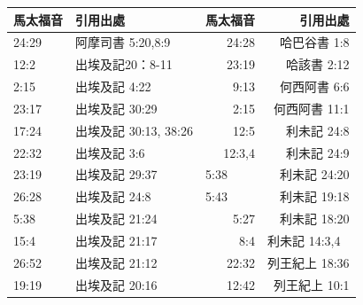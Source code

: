 \begin{table}[htbp]
  \centering

    \begin{tabular}{|p{6.93em}|p{13.93em}|r|r|}
    \toprule
    \rowcolor[rgb]{ .749,  .749,  .749} \textcolor[rgb]{ .267,  .447,  .769}{\textbf{馬太福音}} & \textcolor[rgb]{ .267,  .447,  .769}{\textbf{引用出處}} & \multicolumn{1}{p{6.715em}|}{\textcolor[rgb]{ .267,  .447,  .769}{\textbf{馬太福音}}} & \multicolumn{1}{p{12.645em}|}{\textcolor[rgb]{ .267,  .447,  .769}{\textbf{引用出處}}} \\
    \midrule
    24:29 & 阿摩司書 5:20,8:9 & \multicolumn{1}{p{6.715em}|}{24:28} & \multicolumn{1}{p{12.645em}|}{哈巴谷書 1:8} \\
    \midrule
    12:2  & 出埃及記20：8-11 & \multicolumn{1}{p{6.715em}|}{23:19} & \multicolumn{1}{p{12.645em}|}{哈該書 2:12} \\
    \midrule
    2:15  & 出埃及記 4:22 & \multicolumn{1}{p{6.715em}|}{9:13} & \multicolumn{1}{p{12.645em}|}{何西阿書 6:6} \\
    \midrule
    23:17 & 出埃及記 30:29 & \multicolumn{1}{p{6.715em}|}{2:15} & \multicolumn{1}{p{12.645em}|}{何西阿書 11:1} \\
    \midrule
    17:24 & 出埃及記 30:13, 38:26 & \multicolumn{1}{p{6.715em}|}{12:5} & \multicolumn{1}{p{12.645em}|}{利未記 24:8} \\
    \midrule
    22:32 & 出埃及記 3:6 & \multicolumn{1}{p{6.715em}|}{12:3,4} & \multicolumn{1}{p{12.645em}|}{利未記 24:9} \\
    \midrule
    23:19 & 出埃及記 29:37 & \multicolumn{1}{l|}{5:38} & \multicolumn{1}{p{12.645em}|}{利未記 24:20} \\
    \midrule
    26:28 & 出埃及記 24:8 & \multicolumn{1}{l|}{5:43} & \multicolumn{1}{p{12.645em}|}{利未記 19:18} \\
    \midrule
    \multicolumn{1}{|l|}{5:38} & 出埃及記 21:24 & \multicolumn{1}{p{6.715em}|}{5:27} & \multicolumn{1}{p{12.645em}|}{利未記 18:20} \\
    \midrule
    15:4  & 出埃及記 21:17 & \multicolumn{1}{p{6.715em}|}{8:4} & \multicolumn{1}{l|}{利未記 14:3,4} \\
    \midrule
    26:52 & 出埃及記 21:12 & \multicolumn{1}{p{6.715em}|}{22:32} & \multicolumn{1}{p{12.645em}|}{列王紀上 18:36} \\
    \midrule
    19:19 & 出埃及記 20:16 & \multicolumn{1}{p{6.715em}|}{12:42} & \multicolumn{1}{p{12.645em}|}{列王紀上 10:1} \\

\end{tabular}
\end{table}
